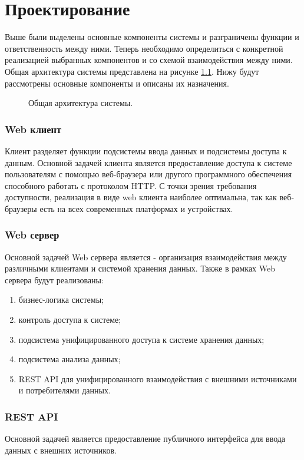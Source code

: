 \newpage
\chapter{Проектирование}
Выше были выделены основные компоненты системы и разграничены функции и
ответственность между ними. Теперь необходимо определиться с конкретной
реализацией выбранных компонентов и со схемой взаимодействия между ними. 
Общая архитектура системы представлена на рисунке
\ref{ris:general_architecture}. Нижу будут рассмотрены основные компоненты
и описаны их назначения.

\begin{figure}[h]
\caption{Общая архитектура системы.}
\label{ris:general_architecture}
\end{figure}

\subsection{Web клиент}
Клиент разделяет функции подсистемы ввода данных и подсистемы доступа к данным.
Основной задачей клиента является предоставление доступа к системе пользователям
с помощью веб-браузера или другого программного обеспечения способного работать
с протоколом HTTP. С точки зрения требования доступности, реализация в виде web
клиента наиболее оптимальна, так как веб-браузеры есть на всех современных
платформах и устройствах.

\subsection{Web сервер}
Основной задачей Web сервера является - организация взаимодействия между
различными клиентами и системой хранения данных. Также в рамках Web сервера
будут реализованы:
\begin{enumerate}
  \item бизнес-логика системы;
  \item контроль доступа к системе;
  \item подсистема унифицированного доступа к системе хранения данных;
  \item подсистема анализа данных;
  \item REST API для унифицированного взаимодействия с внешними источниками и
потребителями данных.
\end{enumerate}

\subsection{REST API}
Основной задачей является предоставление публичного интерфейса для ввода данных
с внешних источников.

